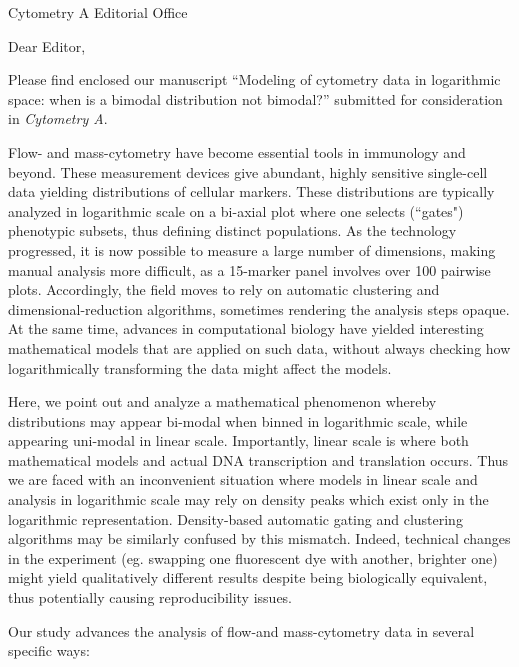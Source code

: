 \documentclass[11pt]{letter}
\begin{document}
\begin{letter}{Cytometry A Editorial Office}


\signature{Amir Erez}

\opening{Dear Editor,}

Please find enclosed our manuscript ``Modeling of cytometry data in logarithmic space: when is a bimodal distribution not bimodal?'' submitted for consideration in {\it Cytometry A}.

Flow- and mass-cytometry have become essential tools in immunology and beyond. These measurement devices give abundant, highly sensitive single-cell data yielding distributions of cellular markers. These distributions are typically analyzed in logarithmic scale on a bi-axial plot where one selects (``gates") phenotypic subsets, thus defining distinct populations. As the technology progressed, it is now possible to measure a large number of dimensions, making manual analysis more difficult, as a 15-marker panel involves over 100 pairwise plots. Accordingly, the field moves to rely on automatic clustering and dimensional-reduction algorithms, sometimes rendering the analysis steps opaque. At the same time, advances in computational biology have yielded interesting mathematical models that are applied on such data, without always checking how logarithmically transforming the data might affect the models.

Here, we point out and analyze a mathematical phenomenon whereby distributions may appear bi-modal when binned in logarithmic scale, while appearing uni-modal in linear scale. Importantly, linear scale is where both mathematical models and actual DNA transcription and translation occurs. Thus we are faced with an inconvenient situation where models in linear scale and analysis in logarithmic scale may rely on density peaks which exist only in the logarithmic representation. Density-based automatic gating and clustering algorithms may be similarly confused by this mismatch. Indeed, technical changes in the experiment (eg. swapping one fluorescent dye with another, brighter one) might yield qualitatively different results despite being biologically equivalent, thus potentially causing reproducibility issues. 

Our study advances the analysis of flow-and mass-cytometry data in several specific ways:


\end{letter}
\end{document}
